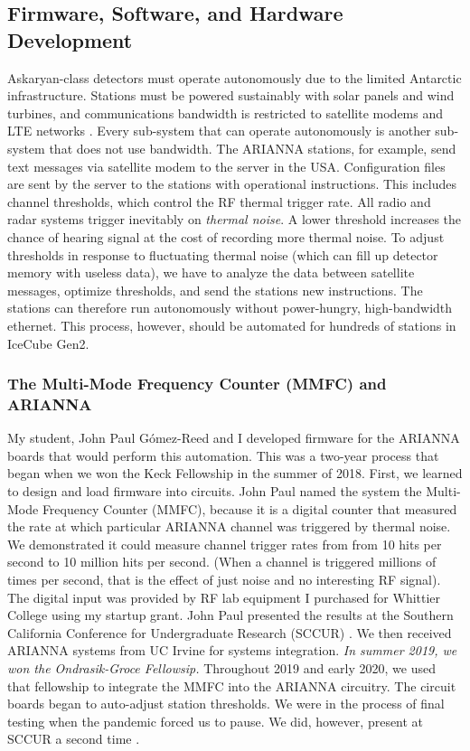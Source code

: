 \documentclass[../../../main.tex]{subfiles}
\begin{document}
\subsection{Firmware, Software, and Hardware Development}

Askaryan-class detectors must operate autonomously due to the limited Antarctic infrastructure.  Stations must be powered sustainably with solar panels and wind turbines, and communications bandwidth is restricted to satellite modems and LTE networks \cite{10.1109/tns.2015.2468182} \cite{Aguilar_2021}.  Every sub-system that can operate autonomously is another sub-system that does not use bandwidth.  The ARIANNA stations, for example, send text messages via satellite modem to the server in the USA.  Configuration files are sent by the server to the stations with operational instructions.  This includes channel thresholds, which control the RF thermal trigger rate.  All radio and radar systems trigger inevitably on \textit{thermal noise}.  A lower threshold increases the chance of hearing signal at the cost of recording more thermal noise.  To adjust thresholds in response to fluctuating thermal noise (which can fill up detector memory with useless data), we have to analyze the data between satellite messages, optimize thresholds, and send the stations new instructions.  The stations can therefore run autonomously without power-hungry, high-bandwidth ethernet.  This process, however, should be automated for hundreds of stations in IceCube Gen2.

\subsubsection{The Multi-Mode Frequency Counter (MMFC) and ARIANNA}

My student, John Paul G\'{o}mez-Reed and I developed firmware for the ARIANNA boards that would perform this automation.  This was a two-year process that began when we won the Keck Fellowship in the summer of 2018. First, we learned to design and load firmware into circuits.  John Paul named the system the Multi-Mode Frequency Counter (MMFC), because it is a digital counter that measured the rate at which particular ARIANNA channel was triggered by thermal noise.  We demonstrated it could measure channel trigger rates from from 10 hits per second to 10 million hits per second.  (When a channel is triggered millions of times per second, that is the effect of just noise and no interesting RF signal).  The digital input was provided by RF lab equipment I purchased for Whittier College using my startup grant. John Paul presented the results at the Southern California Conference for Undergraduate Research (SCCUR) \cite{sccur1}.  We then received ARIANNA systems from UC Irvine for systems integration.  \textit{In summer 2019, we won the Ondrasik-Groce Fellowsip.}  Throughout 2019 and early 2020, we used that fellowship to integrate the MMFC into the ARIANNA circuitry.  The circuit boards began to auto-adjust station thresholds.  We were in the process of final testing when the pandemic forced us to pause.  We did, however, present at SCCUR a second time \cite{sccur2}.
\end{document}

